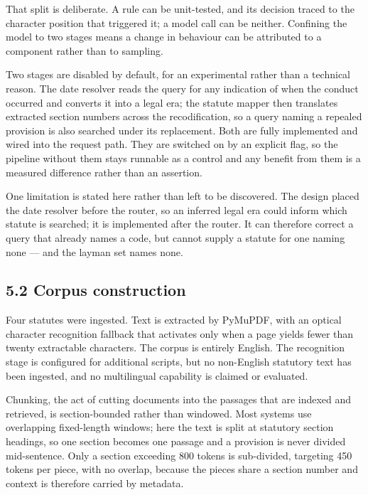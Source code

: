 \documentclass[12pt,a4paper]{article}
\begin{document}
That split is deliberate. A rule can be unit-tested, and its decision traced to the character position that triggered it; a model call can be neither. Confining the model to two stages means a change in behaviour can be attributed to a component rather than to sampling.

Two stages are disabled by default, for an experimental rather than a technical reason. The date resolver reads the query for any indication of when the conduct occurred and converts it into a legal era; the statute mapper then translates extracted section numbers across the recodification, so a query naming a repealed provision is also searched under its replacement. Both are fully implemented and wired into the request path. They are switched on by an explicit flag, so the pipeline without them stays runnable as a control and any benefit from them is a measured difference rather than an assertion.

One limitation is stated here rather than left to be discovered. The design placed the date resolver before the router, so an inferred legal era could inform which statute is searched; it is implemented after the router. It can therefore correct a query that already names a code, but cannot supply a statute for one naming none --- and the layman set names none.

\subsection*{5.2 Corpus construction}
Four statutes were ingested. Text is extracted by PyMuPDF, with an optical character recognition fallback that activates only when a page yields fewer than twenty extractable characters. The corpus is entirely English. The recognition stage is configured for additional scripts, but no non-English statutory text has been ingested, and no multilingual capability is claimed or evaluated.

Chunking, the act of cutting documents into the passages that are indexed and retrieved, is section-bounded rather than windowed. Most systems use overlapping fixed-length windows; here the text is split at statutory section headings, so one section becomes one passage and a provision is never divided mid-sentence. Only a section exceeding 800 tokens is sub-divided, targeting 450 tokens per piece, with no overlap, because the pieces share a section number and context is therefore carried by metadata.
\end{document}
